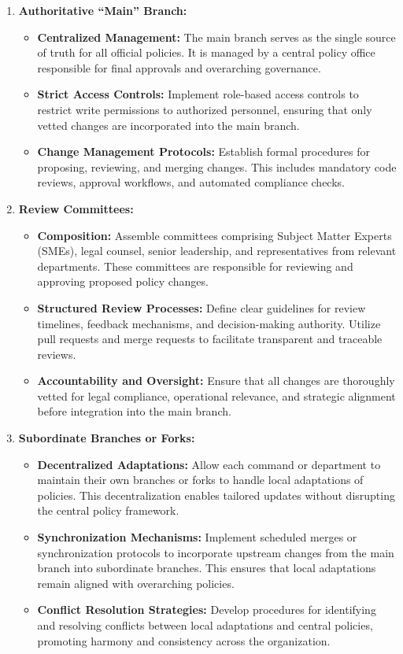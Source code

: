 \documentclass[11pt]{article}
\begin{document}
\begin{enumerate}
    \item \textbf{Authoritative ``Main'' Branch:}
    \begin{itemize}
        \item \textbf{Centralized Management:} The main branch serves as the single source of truth for all official policies. It is managed by a central policy office responsible for final approvals and overarching governance.
        \item \textbf{Strict Access Controls:} Implement role-based access controls to restrict write permissions to authorized personnel, ensuring that only vetted changes are incorporated into the main branch.
        \item \textbf{Change Management Protocols:} Establish formal procedures for proposing, reviewing, and merging changes. This includes mandatory code reviews, approval workflows, and automated compliance checks.
    \end{itemize}

    \item \textbf{Review Committees:}
    \begin{itemize}
        \item \textbf{Composition:} Assemble committees comprising Subject Matter Experts (SMEs), legal counsel, senior leadership, and representatives from relevant departments. These committees are responsible for reviewing and approving proposed policy changes.
        \item \textbf{Structured Review Processes:} Define clear guidelines for review timelines, feedback mechanisms, and decision-making authority. Utilize pull requests and merge requests to facilitate transparent and traceable reviews.
        \item \textbf{Accountability and Oversight:} Ensure that all changes are thoroughly vetted for legal compliance, operational relevance, and strategic alignment before integration into the main branch.
    \end{itemize}

    \item \textbf{Subordinate Branches or Forks:}
    \begin{itemize}
        \item \textbf{Decentralized Adaptations:} Allow each command or department to maintain their own branches or forks to handle local adaptations of policies. This decentralization enables tailored updates without disrupting the central policy framework.
        \item \textbf{Synchronization Mechanisms:} Implement scheduled merges or synchronization protocols to incorporate upstream changes from the main branch into subordinate branches. This ensures that local adaptations remain aligned with overarching policies.
        \item \textbf{Conflict Resolution Strategies:} Develop procedures for identifying and resolving conflicts between local adaptations and central policies, promoting harmony and consistency across the organization.
    \end{itemize}


\end{enumerate}
\end{document}
